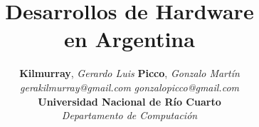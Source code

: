 \documentclass[%
 	final,
%
	notitlepage,
	narroweqnarray,
	inline,
 	twoside,
	]{ieee}
\begin{document}
\onecolumn
\title[Hardware en Argentina]{\sffamily \textbf{Desarrollos de Hardware \\en Argentina}}
\author{\textbf{Kilmurray}, \textit{Gerardo Luis} \hspace{4cm} \textbf{Picco}, \textit{Gonzalo Mart\'in}\\
        \small{\textit{gerakilmurray@gmail.com}}  \hspace{5.5cm}  \small{\textit{gonzalopicco@gmail.com}} \\ [0.5cm] 
	\large \textbf{Universidad Nacional de R\'io Cuarto}\\ \textit{Departamento de Computaci\'on}\\[1cm]
	} 



\maketitle 
\sloppy
\end{document}
